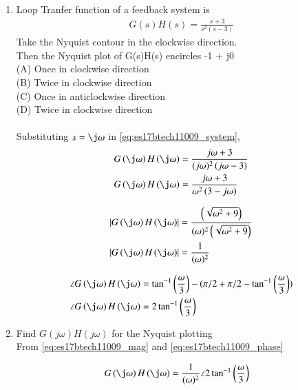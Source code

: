 \begin{enumerate}[label=\thesection.\arabic*.,ref=\thesection.\theenumi]

\item Loop Tranfer function of a feedback system is 
\begin{align}
G(s)H(s) = \frac{s+3}{s^2(s-3)}
\label{eq:es17btech11009_system}
\end{align}
Take the Nyquist contour in the clockwise direction.
\\
Then the Nyquist plot of G(s)H(s) encircles -1 + j0
\\
(A) Once in clockwise direction
\\
(B) Twice in clockwise direction
\\
(C) Once in anticlockwise direction
\\
(D) Twice in clockwise direction
\\
\\
\solution Substituting $s = \j\omega$ in \eqref{eq:es17btech11009_system},
\begin{align}
G\brak{\j\omega}H\brak{\j\omega}&=\frac{j\omega+3}{(j\omega)^2\brak{j\omega- 3}}
\\
G\brak{\j\omega}H\brak{\j\omega}&=\frac{j\omega+3}{\omega^2\brak{3 - j\omega}}
\end{align}

\begin{align}
\abs{G\brak{\j\omega}H\brak{\j\omega}}&=\frac{\brak{\sqrt{\omega^2+9}}}{(\omega)^2\brak{\sqrt{\omega^2+9}}}
\\
\abs{G\brak{\j\omega}H\brak{\j\omega}}&=\dfrac{1}{(\omega)^2}
\label{eq:es17btech11009_mag}
\end{align}

\begin{align}
\angle{G\brak{\j\omega}H\brak{\j\omega}}&= \tan^{-1}\brak{\frac{\omega}{3}} - (\pi/2 + \pi/2 -  \tan^{-1}\brak{\frac{\omega}{3}} )
\\
\angle{G\brak{\j\omega}H\brak{\j\omega}}&= 2\tan^{-1}\brak{\frac{\omega}{3}}
\label{eq:es17btech11009_phase}
\end{align}

\item Find $G(j\omega)H(j\omega)$ for the Nyquist plotting
\\
\solution From \eqref{eq:es17btech11009_mag} and \eqref{eq:es17btech11009_phase} 

\begin{align}
G\brak{\j\omega}H\brak{\j\omega}&= \dfrac{1}{(\omega)^2}\angle2\tan^{-1}\brak{\frac{\omega}{3}}
\end{align}


\end{enumerate}
